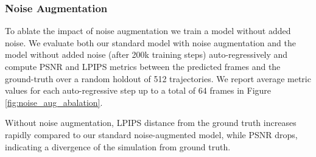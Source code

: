 \documentclass{article} %
\begin{document}
\begin{table}[h]
\caption{\textbf{Number of history frames.} We ablate the number of history frames used as context using 8912 test-set examples from 5 levels. More frames generally improve both PSNR and LPIPS metrics.
\label{table:number_of_frames_ablation}}
\centering
\vspace{0.05in}
\end{table}

\subsubsection{Noise Augmentation}
\label{noise-aug-abalation}

To ablate the impact of noise augmentation we train a model without added noise.
We evaluate both our standard model with noise augmentation and the model without added noise (after 200k training steps) auto-regressively and compute PSNR and LPIPS metrics between the predicted frames and the ground-truth over a random holdout of 512 trajectories.
We report average metric values for each auto-regressive step up to a total of 64 frames in Figure \ref{fig:noise_aug_abalation}.

Without noise augmentation, LPIPS distance from the ground truth increases rapidly compared to our standard noise-augmented model, while PSNR drops, indicating a divergence of the simulation from ground truth.
\end{document}
